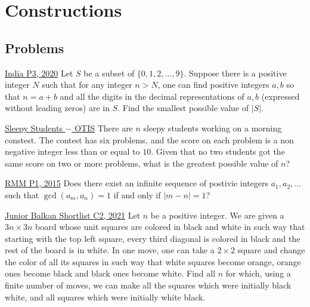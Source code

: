 \section{Constructions}
\subsection{Problems}
\begin{problem}{1}{\href{https://artofproblemsolving.com/community/c6h1989008p34732913}{India P3, 2020}}
	Let $S$ be a subset of $\{0,1,2,\dots ,9\}$. Suppose there is a positive integer $N$ such that for any integer $n>N$, one can find positive integers $a,b$ so that $n=a+b$ and all the digits in the decimal representations of $a,b$ (expressed without leading zeros) are in $S$. Find the smallest possible value of $|S|$.
\end{problem}


\begin{problem}{2}{\href{https://otis.evanchen.cc/arch/SASHAOPT/}{Sleepy Students $-$ OTIS}} 
	There are $n$ sleepy students working on a morning constest. The contest  has six problems, and the score on each problem is a non negative integer less than or equal to $10$. Given that no two students got the same score on two or more problems, what is the greatest possible value of $n$?
\end{problem}


\begin{problem}{3}{\href{https://artofproblemsolving.com/community/c6h627236p3763526}{RMM P1, 2015}}
	Does there exist an infinite sequence of postivie integers $a_1, a_2, \ldots$ such that $\gcd(a_m, a_n)=1$ if and only if $|m-n|=1$?
\end{problem}


\begin{problem}{4}{\href{https://artofproblemsolving.com/community/c6h2876405p34326572}{Junior Balkan Shortlist C2, 2021}}
	Let $n$ be a positive integer. We are given a $3n \times 3n$ board whose unit squares are colored in black and white in such way that starting with the top left square, every third diagonal is colored in black and the rest of the board is in white. In one move, one can take a $2 \times 2$ square and change the color of all its squares in such way that white squares become orange, orange ones become black and black ones become white. Find all $n$ for which, using a finite number of moves, we can make all the squares which were initially black white, and all squares which were initially white black.
\end{problem}


